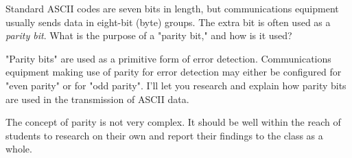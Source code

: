 

Standard ASCII codes are seven bits in length, but communications equipment usually sends data in eight-bit (byte) groups.  The extra bit is often used as a {\it parity bit}.  What is the purpose of a "parity bit," and how is it used?







"Parity bits" are used as a primitive form of error detection.  Communications equipment making use of parity for error detection may either be configured for "even parity" or for "odd parity".  I'll let you research and explain how parity bits are used in the transmission of ASCII data.







The concept of parity is not very complex.  It should be well within the reach of students to research on their own and report their findings to the class as a whole.




